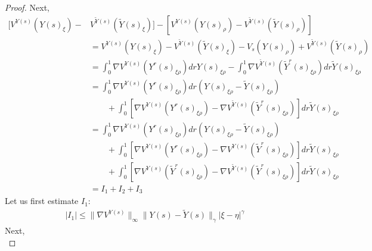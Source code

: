 \documentclass[a4paper,12pt,reqno]{amsart}
\newcommand{\wt}{\widetilde}
\newcommand{\norm}[1]{\|#1\|}
\begin{document}
\begin{proof}
Next,
\begin{equation}
\label{eq:large-expansion}
  \begin{split}
[V^{Y(s)}(Y(s)_\xi) - & V^{\wt Y(s)}(\wt Y(s)_\xi)]-
[V^{Y(s)}(Y(s)_\rho) - V^{\wt Y(s)}(\wt Y(s)_\rho)]
 \\& =  V^{Y(s)}(Y(s)_\xi) - V^{\wt Y(s)}(\wt
Y(s)_\xi) - V_s(Y(s)_\rho) + V^{\wt Y(s)}(\wt Y(s)_\rho)
\\ & = \int_0^1  \nabla V^{Y(s)}(Y^r(s)_{\xi\rho}) dr
Y(s)_{\xi\rho}-\int_0^1  \nabla V^{\wt Y(s)}(\wt Y^{r}(s)_{\xi\rho}) dr
\wt Y(s)_{\xi\rho}
%
\\ & = \int_0^1  \nabla V^{Y(s)}(Y^r(s)_{\xi\rho}) dr
(Y(s)_{\xi\rho}-\wt Y(s)_{\xi\rho})
\\ & \qquad + \int_0^1  \left[\nabla V^{Y(s)}(Y^r(s)_{\xi\rho}) -
  \nabla V^{\wt Y(s)}(\wt Y^{r}(s)_{\xi\rho})\right] dr
\wt Y(s)_{\xi\rho}
%
\\ & = \int_0^1  \nabla V^{Y(s)}(Y^r(s)_{\xi\rho}) dr
(Y(s)_{\xi\rho}-\wt Y(s)_{\xi\rho})
\\ & \qquad + \int_0^1  \left[\nabla V^{Y(s)}(Y^r(s)_{\xi\rho}) -
  \nabla V^{Y(s)}(\wt Y^{r}(s)_{\xi\rho})\right] dr
\wt Y(s)_{\xi\rho}
\\ & \qquad + \int_0^1  \left[\nabla V^{Y(s)}(\wt Y^{ r}(s)_{\xi\rho})
  - \nabla V^{\wt Y(s)}(\wt Y^{ r}(s)_{\xi\rho})\right] dr
\wt Y(s)_{\xi\rho}
%
\\ & = I_1 + I_2 + I_3
  \end{split}
\end{equation}
Let us first estimate $I_1$:
\begin{equation*}
  \begin{split}
 |I_1| \le \norm{\nabla V^{Y(s)}}_\infty \norm{Y(s)-\wt Y(s)}_\gamma
  |\xi-\eta|^\gamma
  \end{split}
\end{equation*}
Next,
\begin{equation*}

\end{equation*}
\end{proof}
\end{document}
